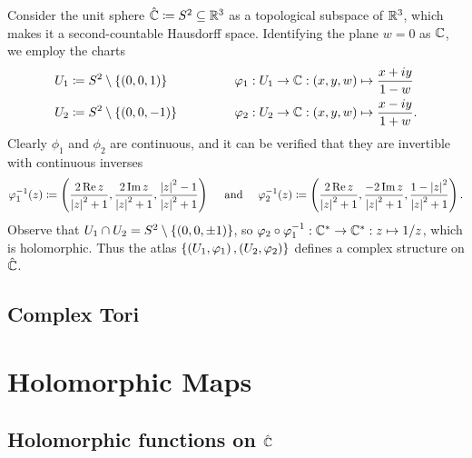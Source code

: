 \begin{example}
    Consider the unit sphere $\hat{\mathbb{C}}\coloneqq S^2\subseteq\mathbb{R}^3$ as a topological subspace of $\mathbb{R}^3$, which makes it a second-countable Hausdorff space. Identifying the plane $w=0$ as $\mathbb{C}$, we employ the charts
    \begin{equation*}
        \begin{alignedat}{2}
            U_1&\coloneqq S^2\comp\l\{\l(0,0,1\r)\r\}\ \ \ \ \ \ \ \ \ \ \ \ \ \ \ \ &&\phi_1:U_1\to\C:\tpl{x,y,w}\mapsto\frac{x+iy}{1-w} \\
            U_2&\coloneqq S^2\comp\l\{\l(0,0,-1\r)\r\}&&\phi_2:U_2\to\C:\tpl{x,y,w}\mapsto\frac{x-iy}{1+w}.
        \end{alignedat}
    \end{equation*}
    Clearly $\phi_1$ and $\phi_2$ are continuous, and it can be verified that they are invertible with continuous inverses
    \begin{equation*}
        \phi_1^{-1}\!\l(z\r)\coloneqq\tpl{\frac{2\Re z}{\l|z\r|^2+1},\frac{2\Im z}{\l|z\r|^2+1},\frac{\l|z\r|^2-1}{\l|z\r|^2+1}}\ \ \ \ \textrm{and}\ \ \ \ \phi_2^{-1}\!\l(z\r)\coloneqq\tpl{\frac{2\Re z}{\l|z\r|^2+1},\frac{-2\Im z}{\l|z\r|^2+1},\frac{1-\l|z\r|^2}{\l|z\r|^2+1}}.
    \end{equation*}
    Observe that $U_1\cap U_2=S^2\setminus\left\{\left(0,0,\pm1\right)\right\}$, so $\varphi_2\circ\varphi_1^{-1}:\mathbb{C}^\ast\to\mathbb{C}^\ast:z\mapsto1/z$, which is holomorphic. Thus the atlas $\left\{\left(U_1,\varphi_1\right),\left(U_2,\varphi_2\right)\right\}$ defines a complex structure on $\hat{\mathbb{C}}$.\exqed
\end{example}
\begin{example}
    
\end{example}
\subsection{Complex Tori}
\section{Holomorphic Maps}
\begin{definition}\label{1:def:holomorphic_maps}

\end{definition}
\subsection{Holomorphic functions on $\hat{\mathbb{C}}$}
